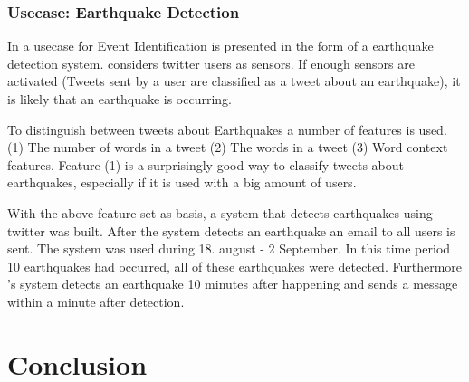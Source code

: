 \documentclass{article}
\begin{document}
\subsubsection{Usecase: Earthquake Detection}
In \cite{earthq} a usecase for Event Identification is presented in the form of a earthquake detection system. \cite{earthq} considers twitter users as sensors. If enough sensors are activated (Tweets sent by a user are classified as a tweet about an earthquake), it is likely that an earthquake is occurring. 

To distinguish between tweets about Earthquakes a number of features is used. (1) The number of words in a tweet (2) The words in a tweet (3) Word context features. Feature (1) is a surprisingly good way to classify tweets about earthquakes, especially if it is used with a big amount of users. 

With the above feature set as basis, a system that detects earthquakes using twitter was built. After the system detects an earthquake an email to all users is sent. The system was used during 18. august - 2 September. In this time period 10 earthquakes had occurred, all of these earthquakes were detected. Furthermore \cite{earthq}'s system detects an earthquake 10 minutes after happening and sends a message within a minute after detection. 
\section{Conclusion}



\end{document}

